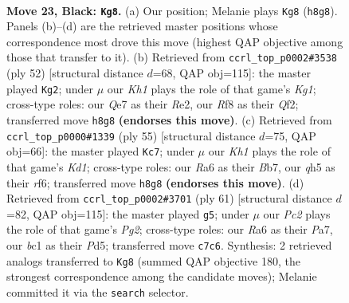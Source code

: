 \documentclass[11pt]{article}
\begin{document}
\clearpage

\begin{figure}[p]\centering
\begin{subfigure}{0.46\textwidth}\centering
\resizebox{\linewidth}{!}{%
\newchessgame
\chessboard[
  setfen={5r1k/2p1qp2/r6p/2p1p1pQ/2P1P1P1/3P4/5K2/1NB2R2 b - - 3 23},
  showmover=false,
  pgfstyle=straightmove, color=movearrow, markmove={h8-g8}
]}
\caption{}
\end{subfigure}\hfill
\begin{subfigure}{0.46\textwidth}\centering
\resizebox{\linewidth}{!}{%
\newchessgame
\chessboard[
  setfen={3r2k1/p4p2/6pb/1p5p/3P3P/1Pq1PBP1/P3RQ2/6K1 w - - 5 27},
  showmover=false,
  pgfstyle=straightmove, color=movearrow, markmove={g1-g2}
]}
\caption{}
\end{subfigure}
\\[4pt]
\begin{subfigure}{0.46\textwidth}\centering
\resizebox{\linewidth}{!}{%
\newchessgame
\chessboard[
  setfen={3k4/1b1r3p/p2qpR2/2p1p2B/P7/2P1Q3/6PP/6K1 b - - 0 28},
  showmover=false,
  pgfstyle=straightmove, color=movearrow, markmove={d8-c7}
]}
\caption{}
\end{subfigure}\hfill
\begin{subfigure}{0.46\textwidth}\centering
\resizebox{\linewidth}{!}{%
\newchessgame
\chessboard[
  setfen={3r2k1/p5p1/3p1q1p/3p1p1b/5Q1P/1P3P2/P1P1RB2/6K1 b - - 1 31},
  showmover=false,
  pgfstyle=straightmove, color=movearrow, markmove={g7-g5}
]}
\caption{}
\end{subfigure}
\caption{\textbf{Move 23, Black: \texttt{Kg8}.} (a) Our position; Melanie plays \texttt{Kg8} (\texttt{h8g8}). Panels (b)--(d) are the retrieved master positions whose correspondence most drove this move (highest QAP objective among those that transfer to it). (b) Retrieved from \texttt{ccrl\_top\_p0002\#3538} (ply 52) [structural distance $d$=68, QAP obj=115]: the master played \texttt{Kg2}; under $\mu$ our \emph{Kh1} plays the role of that game's \emph{Kg1}; cross-type roles: our \emph{Q}e7 as their \emph{R}e2, our \emph{R}f8 as their \emph{Q}f2; transferred move \texttt{h8g8} \textbf{(endorses this move)}. (c) Retrieved from \texttt{ccrl\_top\_p0000\#1339} (ply 55) [structural distance $d$=75, QAP obj=66]: the master played \texttt{Kc7}; under $\mu$ our \emph{Kh1} plays the role of that game's \emph{Kd1}; cross-type roles: our \emph{R}a6 as their \emph{B}b7, our \emph{q}h5 as their \emph{r}f6; transferred move \texttt{h8g8} \textbf{(endorses this move)}. (d) Retrieved from \texttt{ccrl\_top\_p0002\#3701} (ply 61) [structural distance $d$=82, QAP obj=115]: the master played \texttt{g5}; under $\mu$ our \emph{Pc2} plays the role of that game's \emph{Pg2}; cross-type roles: our \emph{R}a6 as their \emph{P}a7, our \emph{b}c1 as their \emph{P}d5; transferred move \texttt{c7c6}. Synthesis: 2 retrieved analogs transferred to \texttt{Kg8} (summed QAP objective 180, the strongest correspondence among the candidate moves); Melanie committed it via the \texttt{search} selector.}
\label{fig:thought-m45}
\end{figure}
\end{document}
